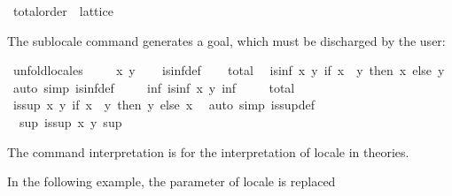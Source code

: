 \begin{isabellebody}
\isamarkupfalse%
\ total{\isacharunderscore}{\kern0pt}order\ {\isasymsubseteq}\ lattice%
\begin{isamarkuptext}%
The sublocale command generates a goal, which must be discharged by the user:%
\end{isamarkuptext}\isamarkuptrue%
%
\isadelimproof
%
\endisadelimproof
%
\isatagproof
{}\isamarkupfalse%
\ unfold{\isacharunderscore}{\kern0pt}locales\ \isanewline
\ \ \isamarkupfalse%
\ x\ y\isanewline
\ \ \isamarkupfalse%
\ is{\isacharunderscore}{\kern0pt}inf{\isacharunderscore}{\kern0pt}def\isanewline
\ \ \isamarkupfalse%
\ total\ \isamarkupfalse%
\ {\isachardoublequoteopen}is{\isacharunderscore}{\kern0pt}inf\ x\ y\ {\isacharparenleft}{\kern0pt}if\ x\ {\isasymsqsubseteq}\ y\ then\ x\ else\ y{\isacharparenright}{\kern0pt}{\isachardoublequoteclose}\ \isamarkupfalse%
\ {\isacharparenleft}{\kern0pt}auto\ simp{\isacharcolon}{\kern0pt}\ is{\isacharunderscore}{\kern0pt}inf{\isacharunderscore}{\kern0pt}def{\isacharparenright}{\kern0pt}\isanewline
\ \ \isamarkupfalse%
\ {\isachardoublequoteopen}{\isasymexists}\ inf{\isachardot}{\kern0pt}\ is{\isacharunderscore}{\kern0pt}inf\ x\ y\ inf{\isachardoublequoteclose}\ \isacommand{{\isachardot}{\kern0pt}{\isachardot}{\kern0pt}}\isamarkupfalse%
\isanewline
\ \ \isamarkupfalse%
\ total\ \isamarkupfalse%
\ {\isachardoublequoteopen}is{\isacharunderscore}{\kern0pt}sup\ x\ y\ {\isacharparenleft}{\kern0pt}if\ x\ {\isasymsqsubseteq}\ y\ then\ y\ else\ x{\isacharparenright}{\kern0pt}{\isachardoublequoteclose}\ \isamarkupfalse%
\ {\isacharparenleft}{\kern0pt}auto\ simp{\isacharcolon}{\kern0pt}\ is{\isacharunderscore}{\kern0pt}sup{\isacharunderscore}{\kern0pt}def{\isacharparenright}{\kern0pt}\isanewline
\ \ \isamarkupfalse%
\ {\isachardoublequoteopen}{\isasymexists}\ sup{\isachardot}{\kern0pt}\ is{\isacharunderscore}{\kern0pt}sup\ x\ y\ sup{\isachardoublequoteclose}\ \isacommand{{\isachardot}{\kern0pt}{\isachardot}{\kern0pt}}\isamarkupfalse%
\isanewline
{}\isamarkupfalse%
%
\endisatagproof
{\isafoldproof}%
%
\isadelimproof
%
\endisadelimproof
%
\begin{isamarkuptext}%
The command interpretation is for the interpretation of locale in theories.%
\end{isamarkuptext}\isamarkuptrue%
%
\begin{isamarkuptext}%
In the following example, the parameter of locale  is replaced

\end{isamarkuptext}
\end{isabellebody}
